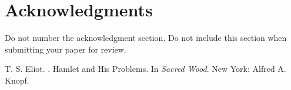 \documentclass[11pt]{article}
\begin{document}
\section*{Acknowledgments}

Do not number the acknowledgment section. Do not include this section when submitting your paper for review.





\begin{thebibliography}{}
T. S. Eliot.
.
\newblock Hamlet and His Problems.
\newblock In {\em Sacred Wood}.
\newblock New York: Alfred A. Knopf.

\end{thebibliography}



\clearpage
\end{document}

